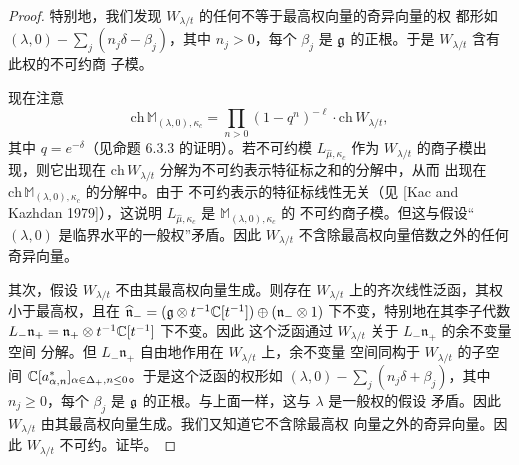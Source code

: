 \begin{proof}
    特别地，我们发现 $W_{\lambda/t}$ 的任何不等于最高权向量的奇异向量的权
    都形如 $(\lambda,0)-\sum_j(n_j\delta-\beta_j)$，其中 $n_j>0$，每个
    $\beta_j$ 是 $\mathfrak{g}$ 的正根。于是 $W_{\lambda/t}$ 含有此权的不可约商
    子模。

    现在注意
    \[
        \mathrm{ch}\,\mathbb M_{(\lambda,0),\kappa_c}
        =\prod_{n>0}(1-q^n)^{-\ell}\cdot
        \mathrm{ch}\,W_{\lambda/t},
    \]
    其中 $q=e^{-\delta}$（见命题 6.3.3 的证明）。若不可约模
    $L_{\widehat\mu,\kappa_c}$ 作为 $W_{\lambda/t}$ 的商子模出现，则它出现在
    $\mathrm{ch}\,W_{\lambda/t}$ 分解为不可约表示特征标之和的分解中，从而
    出现在 $\mathrm{ch}\,\mathbb M_{(\lambda,0),\kappa_c}$ 的分解中。由于
    不可约表示的特征标线性无关（见 [Kac and Kazhdan 1979]），这说明
    $L_{\widehat\mu,\kappa_c}$ 是 $\mathbb M_{(\lambda,0),\kappa_c}$ 的
    不可约商子模。但这与假设“$(\lambda,0)$ 是临界水平的一般权”矛盾。因此
    $W_{\lambda/t}$ 不含除最高权向量倍数之外的任何奇异向量。

    其次，假设 $W_{\lambda/t}$ 不由其最高权向量生成。则存在
    $W_{\lambda/t}$ 上的齐次线性泛函，其权小于最高权，且在
    $\widehat{\mathfrak n}_-=(\mathfrak{g}\otimes t^{-1}\mathbb{C}[t^{-1}])\oplus
    (\mathfrak n_-\otimes1)$ 下不变，特别地在其李子代数
    $L_-\mathfrak n_+=\mathfrak n_+\otimes t^{-1}\mathbb{C}[t^{-1}]$ 下不变。因此
    这个泛函通过 $W_{\lambda/t}$ 关于 $L_-\mathfrak n_+$ 的余不变量空间
    分解。但 $L_-\mathfrak n_+$ 自由地作用在 $W_{\lambda/t}$ 上，余不变量
    空间同构于 $W_{\lambda/t}$ 的子空间
    $\mathbb{C}[a^*_{\alpha,n}]_{\alpha\in\Delta_+,n\le0}$。于是这个泛函的权形如
    $(\lambda,0)-\sum_j(n_j\delta+\beta_j)$，其中 $n_j\ge0$，每个
    $\beta_j$ 是 $\mathfrak{g}$ 的正根。与上面一样，这与 $\lambda$ 是一般权的假设
    矛盾。因此 $W_{\lambda/t}$ 由其最高权向量生成。我们又知道它不含除最高权
    向量之外的奇异向量。因此 $W_{\lambda/t}$ 不可约。证毕。
\end{proof}

\endgroup



